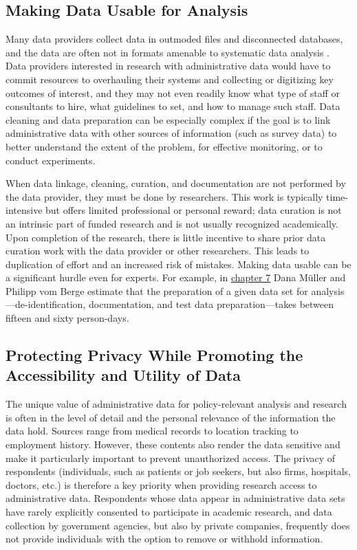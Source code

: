 \hypertarget{making-data-usable-for-analysis}{%
\subsection{Making Data Usable for Analysis}\label{making-data-usable-for-analysis}}

Many data providers collect data in outmoded files and disconnected databases, and the data are often not in formats amenable to systematic data analysis \citep{groves2018, hand2018}. Data providers interested in research with administrative data would have to commit resources to overhauling their systems and collecting or digitizing key outcomes of interest, and they may not even readily know what type of staff or consultants to hire, what guidelines to set, and how to manage such staff. Data cleaning and data preparation can be especially complex if the goal is to link administrative data with other sources of information (such as survey data) to better understand the extent of the problem, for effective monitoring, or to conduct experiments.

When data linkage, cleaning, curation, and documentation are not performed by the data provider, they must be done by researchers. This work is typically time-intensive but offers limited professional or personal reward; data curation is not an intrinsic part of funded research and is not usually recognized academically. Upon completion of the research, there is little incentive to share prior data curation work with the data provider or other researchers. This leads to duplication of effort and an increased risk of mistakes. Making data usable can be a significant hurdle even for experts. For example, in \protect\hyperlink{iab}{chapter 7} Dana Müller and Philipp vom Berge estimate that the preparation of a given data set for analysis---de-identification, documentation, and test data preparation---takes between fifteen and sixty person-days.

\hypertarget{protecting-privacy-while-promoting-the-accessibility-and-utility-of-data}{%
\subsection{Protecting Privacy While Promoting the Accessibility and Utility of Data}\label{protecting-privacy-while-promoting-the-accessibility-and-utility-of-data}}

The unique value of administrative data for policy-relevant analysis and research is often in the level of detail and the personal relevance of the information the data hold. Sources range from medical records to location tracking to employment history. However, these contents also render the data sensitive and make it particularly important to prevent unauthorized access. The privacy of respondents (individuals, such as patients or job seekers, but also firms, hospitals, doctors, etc.) is therefore a key priority when providing research access to administrative data. Respondents whose data appear in administrative data sets have rarely explicitly consented to participate in academic research, and data collection by government agencies, but also by private companies, frequently does not provide individuals with the option to remove or withhold information.

